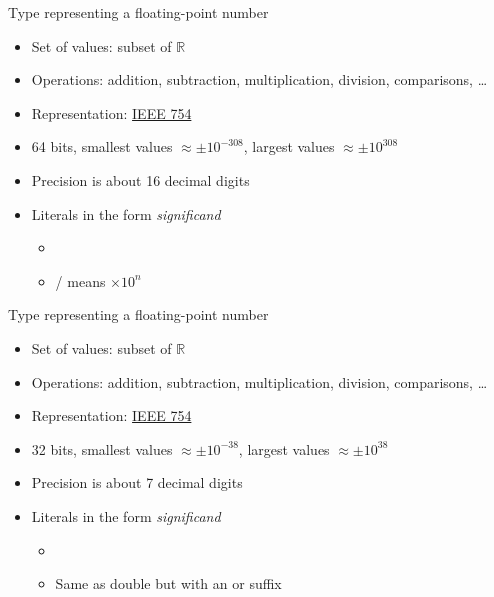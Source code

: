 \begin{frame}[fragile]{}

  Type representing a floating-point number

  \begin{itemize}
  \item<2-> Set of values: subset of $\mathbb{R}$
  \item<3-> Operations: addition, subtraction, multiplication, division, comparisons, \ldots
  \item<4-> Representation: \href{https://en.wikipedia.org/wiki/IEEE_754}{IEEE 754}
  \item<5-> 64 bits, smallest values $\approx\pm10^{-308}$, largest values $\approx\pm10^{308}$
  \item<6-> Precision is about 16 decimal digits
  \item<6-> Literals in the form  \textit{significand} 
    \begin{itemize}
    \item {}
    \item {}/ means $\times 10^{n}$
    \end{itemize}
  \end{itemize}
\end{frame}

\begin{frame}[fragile]{}

  Type representing a floating-point number

  \begin{itemize}
  \item<2-> Set of values: subset of $\mathbb{R}$
  \item<3-> Operations: addition, subtraction, multiplication, division, comparisons, \ldots
  \item<4-> Representation: \href{https://en.wikipedia.org/wiki/IEEE_754}{IEEE 754}
  \item<5-> 32 bits, smallest values $\approx\pm10^{-38}$, largest values $\approx\pm10^{38}$
  \item<6-> Precision is about 7 decimal digits
  \item<6-> Literals in the form  \textit{significand}  
    \begin{itemize}
    \item {}
    \item Same as double but with an  or  suffix
    \end{itemize}
  \end{itemize}
\end{frame}

